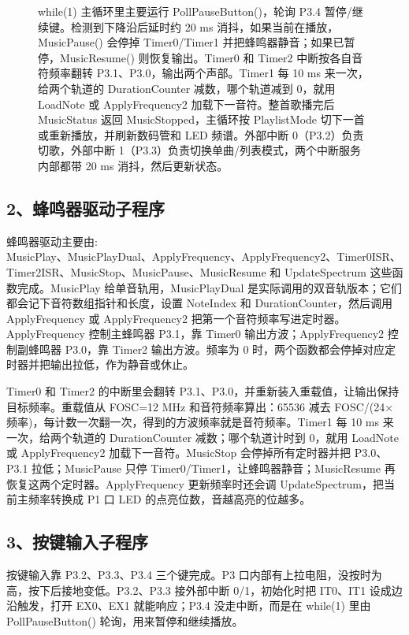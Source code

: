 \documentclass[zihao=-4,a4paper]{ctexart}
\begin{document}
\begin{figure}[H]
\begin{minipage}[c]{0.5\textwidth}
        while(1) 主循环里主要运行 PollPauseButton()，轮询 P3.4 暂停/继续键。检测到下降沿后延时约 20 ms 消抖，如果当前在播放，MusicPause() 会停掉 Timer0/Timer1 并把蜂鸣器静音；如果已暂停，MusicResume() 则恢复输出。Timer0 和 Timer2 中断按各自音符频率翻转 P3.1、P3.0，输出两个声部。Timer1 每 10 ms 来一次，给两个轨道的 DurationCounter 减数，哪个轨道减到 0，就用 LoadNote 或 ApplyFrequency2 加载下一音符。整首歌播完后 MusicStatus 返回 MusicStopped，主循环按 PlaylistMode 切下一首或重新播放，并刷新数码管和 LED 频谱。外部中断 0（P3.2）负责切歌，外部中断 1（P3.3）负责切换单曲/列表模式，两个中断服务内部都带 20 ms 消抖，然后更新状态。
    \end{minipage}
\end{figure}


\subsection*{2、蜂鸣器驱动子程序}

蜂鸣器驱动主要由:\\ MusicPlay、MusicPlayDual、ApplyFrequency、ApplyFrequency2、Timer0ISR、Timer2ISR、MusicStop、MusicPause、MusicResume 和 UpdateSpectrum 这些函数完成。MusicPlay 给单音轨用，MusicPlayDual 是实际调用的双音轨版本；它们都会记下音符数组指针和长度，设置 NoteIndex 和 DurationCounter，然后调用 ApplyFrequency 或 ApplyFrequency2 把第一个音符频率写进定时器。ApplyFrequency 控制主蜂鸣器 P3.1，靠 Timer0 输出方波；ApplyFrequency2 控制副蜂鸣器 P3.0，靠 Timer2 输出方波。频率为 0 时，两个函数都会停掉对应定时器并把输出拉低，作为静音或休止。

Timer0 和 Timer2 的中断里会翻转 P3.1、P3.0，并重新装入重载值，让输出保持目标频率。重载值从 FOSC=12 MHz 和音符频率算出：65536 减去 FOSC/(24×频率)，每计数一次翻一次，得到的方波频率就是音符频率。Timer1 每 10 ms 来一次，给两个轨道的 DurationCounter 减数；哪个轨道计时到 0，就用 LoadNote 或 ApplyFrequency2 加载下一音符。MusicStop 会停掉所有定时器并把 P3.0、P3.1 拉低；MusicPause 只停 Timer0/Timer1，让蜂鸣器静音；MusicResume 再恢复这两个定时器。ApplyFrequency 更新频率时还会调 UpdateSpectrum，把当前主频率转换成 P1 口 LED 的点亮位数，音越高亮的位越多。

\subsection*{3、按键输入子程序}

按键输入靠 P3.2、P3.3、P3.4 三个键完成。P3 口内部有上拉电阻，没按时为高，按下后接地变低。P3.2、P3.3 接外部中断 0/1，初始化时把 IT0、IT1 设成边沿触发，打开 EX0、EX1 就能响应；P3.4 没走中断，而是在 while(1) 里由 PollPauseButton() 轮询，用来暂停和继续播放。
\end{document}
